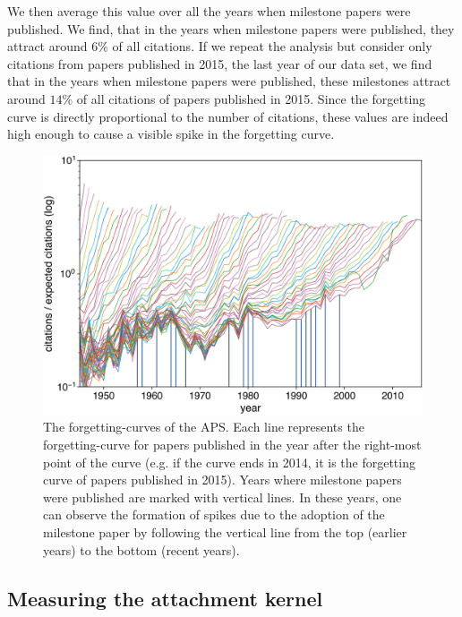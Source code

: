 \documentclass[draft,final]{vutinfth} %
\begin{document}
We then average this value over all the years when milestone papers were published. We find, that in the years when milestone papers were published, they attract around $6\%$ of all citations. If we repeat the analysis but consider only citations from papers published in 2015, the last year of our data set, we find that in the years when milestone papers were published, these milestones attract around $14\%$ of all citations of papers published in 2015. Since the forgetting curve is directly proportional to the number of citations, these values are indeed high enough to cause a visible spike in the forgetting curve. 


\begin{figure}[!ht]
	\centering
	 \includegraphics[width=0.7\columnwidth]{figures_aps/4.png}
	\caption{The forgetting-curves of the APS. Each line represents the forgetting-curve for papers published in the year after the right-most point of the curve (e.g. if the curve ends in 2014, it is the forgetting curve of papers published in 2015). Years where milestone papers were published are marked with vertical lines. In these years, one can observe the formation of spikes due to the adoption of the milestone paper by following the vertical line from the top (earlier years) to the bottom (recent years).
	}
	\label{fig:vitosplot}
\end{figure}



\subsection{Measuring the attachment kernel}
\label{SI3}
\end{document}
